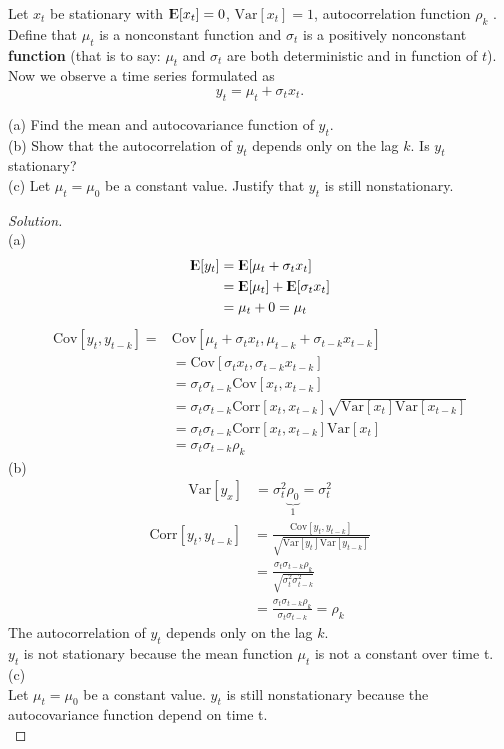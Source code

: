 \documentclass[UTF8,a4paper,14pt]{ctexart}
\newcommand{\E}{{\rm I\kern-.3em E}}
\newcommand{\Var}{\mathrm{Var}}
\newcommand{\Cov}{\mathrm{Cov}}
\newcommand{\Corr}{\mathrm{Corr}}
\newenvironment{solution}
  {\renewcommand\qedsymbol{$\blacksquare$}\begin{proof}[Solution]}
  {\end{proof}}
\theoremstyle{definition}
\theoremstyle{remark}
\begin{document}
\begin{Problem}{}
    Let $x_t$ be stationary with $\E[x_t] = 0$, $\Var[x_t] = 1$, autocorrelation function $\rho_k$ . Define that $\mu_t$ is a nonconstant function and $\sigma_t$ is a positively nonconstant \textbf{function} (that is to say: $\mu_t$ and $\sigma_t$ are both deterministic and in function of $t$). Now we observe a time series formulated as 
\[y_t = \mu_t + \sigma_t x_t.\]

(a) Find the mean and autocovariance function of $y_t$.\\
(b) Show that the autocorrelation of $y_t$ depends only on the lag $k$. Is $y_t$ stationary?\\
(c) Let $\mu_t = \mu_0$ be a constant value. Justify that $y_t$ is still nonstationary.
    
\end{Problem}

\begin{solution}
    \,\\
    (a)
    \begin{align*}
        \E[y_t] &= \E[\mu_t + \sigma_t x_t]\\
        &=\E[\mu_t]+\E[\sigma_t x_t]\\
        &=\mu_t+0=\mu_t
    \end{align*}
    \begin{align*}
        \Cov[y_t,y_{t-k}] = &\Cov[\mu_t + \sigma_t x_t,\mu_{t-k} + \sigma_{t-k} x_{t-k}]\\
        &=\Cov[ \sigma_t x_t, \sigma_{t-k} x_{t-k}]\\
        &=\sigma_t \sigma_{t-k}\Cov[x_t, x_{t-k}]\\
        &=\sigma_t \sigma_{t-k}\Corr[x_t, x_{t-k}]\sqrt{\Var[x_t]\Var[x_{t-k}]}\\
        &=\sigma_t \sigma_{t-k}\Corr[x_t, x_{t-k}]{\Var[x_t]}\\
        &=\sigma_t \sigma_{t-k}\rho_k
    \end{align*}
    (b)
    \begin{align*}
        \Var[y_x] &= \sigma_t^2\underset{1}{\underbrace{\rho_0}} = \sigma_t^2 
    \end{align*}
    \begin{align*}
        \Corr[y_t,y_{t-k}] &= \frac{\Cov[y_t,y_{t-k}]}{\sqrt{\Var[y_t]\Var[y_{t-k}]}}\\
        &=\frac{\sigma_t \sigma_{t-k}\rho_k}{\sqrt{\sigma_t ^2\sigma_{t-k}^2}}\\
        &=\frac{\sigma_t \sigma_{t-k}\rho_k}{\sigma_t \sigma_{t-k}}
        =\rho_k
    \end{align*}
    The autocorrelation of $y_t$ depends only on the lag $k$.\\ $y_t$ is not stationary because the mean function $\mu_t$ is not a constant over time t.\\

    \pagebreak
    \noindent
    (c)\\
    Let $\mu_t = \mu_0$ be a constant value. $y_t$ is still nonstationary because the autocovariance function depend on time t.\\

\end{solution}
\end{document}
